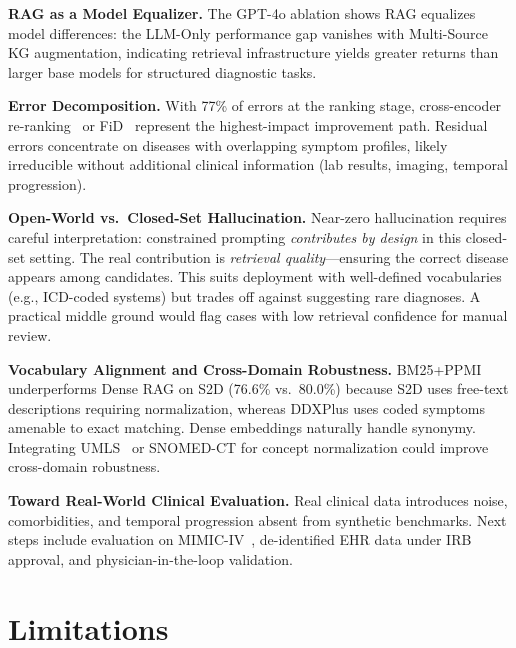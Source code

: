 \documentclass[runningheads]{llncs}
\begin{document}
\textbf{RAG as a Model Equalizer.}
The GPT-4o ablation shows RAG equalizes model differences: the LLM-Only performance gap vanishes with Multi-Source KG augmentation, indicating retrieval infrastructure yields greater returns than larger base models for structured diagnostic tasks.

\textbf{Error Decomposition.}
With 77\% of errors at the ranking stage, cross-encoder re-ranking~\cite{nogueira2020passage} or FiD~\cite{izacard2021leveraging} represent the highest-impact improvement path. Residual errors concentrate on diseases with overlapping symptom profiles, likely irreducible without additional clinical information (lab results, imaging, temporal progression).

\textbf{Open-World vs.\ Closed-Set Hallucination.}
Near-zero hallucination requires careful interpretation: constrained prompting \emph{contributes by design} in this closed-set setting. The real contribution is \emph{retrieval quality}---ensuring the correct disease appears among candidates. This suits deployment with well-defined vocabularies (e.g., ICD-coded systems) but trades off against suggesting rare diagnoses. A practical middle ground would flag cases with low retrieval confidence for manual review.

\textbf{Vocabulary Alignment and Cross-Domain Robustness.}
BM25+PPMI underperforms Dense RAG on S2D (76.6\% vs.\ 80.0\%) because S2D uses free-text descriptions requiring normalization, whereas DDXPlus uses coded symptoms amenable to exact matching. Dense embeddings naturally handle synonymy. Integrating UMLS~\cite{bodenreider2004unified} or SNOMED-CT for concept normalization could improve cross-domain robustness.

\textbf{Toward Real-World Clinical Evaluation.}
\label{sec:realworld}
Real clinical data introduces noise, comorbidities, and temporal progression absent from synthetic benchmarks. Next steps include evaluation on MIMIC-IV~\cite{johnson2023mimic}, de-identified EHR data under IRB approval, and physician-in-the-loop validation.

\section{Limitations}
\label{sec:limitations}
\end{document}
